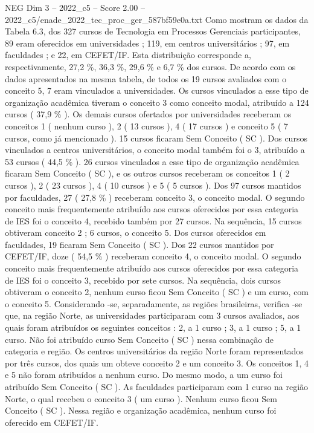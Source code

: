 \begin{textsample}{NEG Dim 3 – 2022\_c5 – Score 2.00 – 2022\_c5/enade\_2022\_tec\_proc\_ger\_587bf59e0a.txt}
Como mostram os dados da Tabela 6.3, dos 327 cursos de Tecnologia em Processos Gerenciais participantes, 89 eram oferecidos em universidades ; 119, em centros universitários ; 97, em faculdades ; e 22, em CEFET/IF.
Esta distribuição corresponde a, respectivamente, 27,2 \%, 36,3 \%, 29,6 \% e 6,7 \% dos cursos.
De acordo com os dados apresentados na mesma tabela, de todos os 19 cursos avaliados com o conceito 5, 7 eram vinculados a universidades.
Os cursos vinculados a esse tipo de organização acadêmica tiveram o conceito 3 como conceito modal, atribuído a 124 cursos ( 37,9 \% ).
Os demais cursos ofertados por universidades receberam os conceitos 1 ( nenhum curso ), 2 ( 13 cursos ), 4 ( 17 cursos ) e conceito 5 ( 7 cursos, como já mencionado ). 15 cursos ficaram Sem Conceito ( SC ).
Dos cursos vinculados a centros universitários, o conceito modal também foi o 3, atribuído a 53 cursos ( 44,5 \% ). 26 cursos vinculados a esse tipo de organização acadêmica ficaram Sem Conceito ( SC ), e os outros cursos receberam os conceitos 1 ( 2 cursos ), 2 ( 23 cursos ), 4 ( 10 cursos ) e 5 ( 5 cursos ).
Dos 97 cursos mantidos por faculdades, 27 ( 27,8 \% ) receberam conceito 3, o conceito modal.
O segundo conceito mais frequentemente atribuído aos cursos oferecidos por essa categoria de IES foi o conceito 4, recebido também por 27 cursos.
Na sequência, 15 cursos obtiveram conceito 2 ; 6 cursos, o conceito 5.
Dos cursos oferecidos em faculdades, 19 ficaram Sem Conceito ( SC ).
Dos 22 cursos mantidos por CEFET/IF, doze ( 54,5 \% ) receberam conceito 4, o conceito modal.
O segundo conceito mais frequentemente atribuído aos cursos oferecidos por essa categoria de IES foi o conceito 3, recebido por sete cursos.
Na sequência, dois cursos obtiveram o conceito 2, nenhum curso ficou Sem Conceito ( SC ) e um curso, com o conceito 5.
Considerando -se, separadamente, as regiões brasileiras, verifica -se que, na região Norte, as universidades participaram com 3 cursos avaliados, aos quais foram atribuídos os seguintes conceitos : 2, a 1 curso ; 3, a 1 curso ; 5, a 1 curso.
Não foi atribuído curso Sem Conceito ( SC ) nessa combinação de categoria e região.
Os centros universitários da região Norte foram representados por três cursos, dos quais um obteve conceito 2 e um conceito 3.
Os conceitos 1, 4 e 5 não foram atribuídos a nenhum curso.
Do mesmo modo, a um curso foi atribuído Sem Conceito ( SC ).
As faculdades participaram com 1 curso na região Norte, o qual recebeu o conceito 3 ( um curso ).
Nenhum curso ficou Sem Conceito ( SC ).
Nessa região e organização acadêmica, nenhum curso foi oferecido em CEFET/IF.

\end{textsample}
